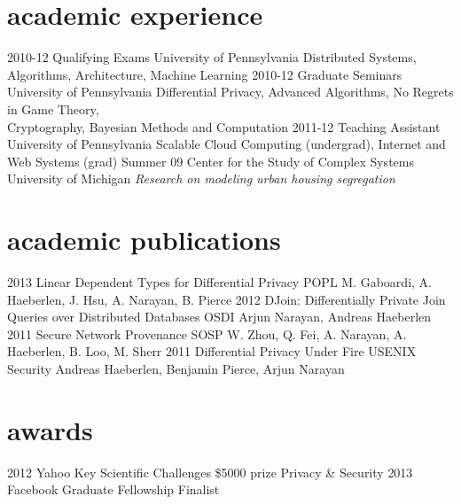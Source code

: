 \documentclass[print]{friggeri-cv}
\begin{document}
\section{academic experience}
\begin{entrylist}
   \entry
    {2010-12}
    {Qualifying Exams}
    {University of Pennsylvania}
    {Distributed Systems, Algorithms, Architecture, Machine Learning}
  \entry
    {2010-12}
    {Graduate Seminars}
    {University of Pennsylvania}
    {Differential Privacy, Advanced Algorithms, No
      Regrets in Game Theory,\\
      Cryptography, Bayesian Methods and Computation}
 \entry
    {2011-12}
    {Teaching Assistant}
    {University of Pennsylvania}
    {Scalable Cloud Computing (undergrad), Internet and Web Systems (grad)}
  \entry
    {Summer 09}
    {Center for the Study of Complex Systems}
    {University of Michigan}
    {\emph{Research on modeling urban housing segregation}}
\end{entrylist}
\section{academic publications}
\begin{entrylist}
 \entry
   {2013}
   {Linear Dependent Types for Differential Privacy}
   {POPL}
   {M. Gaboardi, A. Haeberlen, J. Hsu,
   A. Narayan, B. Pierce}
 \entry
   {2012}
   {DJoin: Differentially Private Join Queries over Distributed Databases}
   {OSDI}
   {Arjun Narayan, Andreas Haeberlen}
  \entry
    {2011}
    {Secure Network Provenance}
    {SOSP}
    {W. Zhou, Q. Fei, A. Narayan,
     A. Haeberlen, B. Loo, M. Sherr}
  \entry
    {2011}
    {Differential Privacy Under Fire}
    {USENIX Security}
    {Andreas Haeberlen, Benjamin Pierce, Arjun Narayan}
\end{entrylist}
\section{awards}
\begin{entrylist}
\entry
   {2012}
   {Yahoo Key Scientific Challenges}
   {\$5000 prize}
   {Privacy \& Security}
\entry
   {2013}
   {Facebook Graduate Fellowship Finalist}
   {}
   {}
\end{entrylist}
\end{document}
